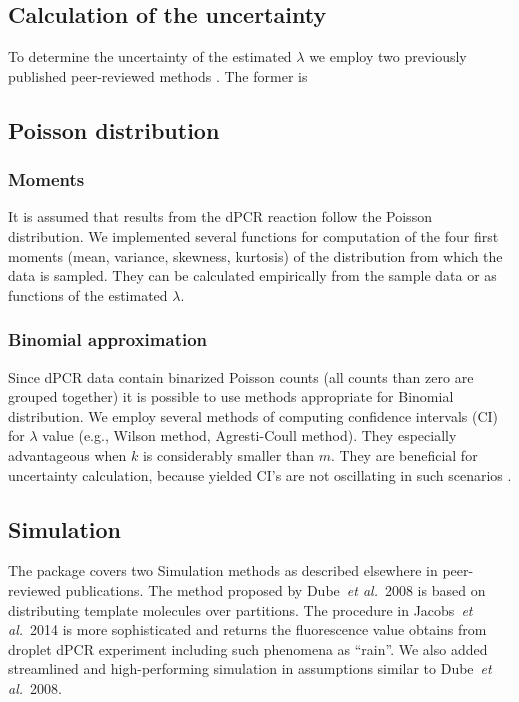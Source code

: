 \documentclass[a4,center,fleqn]{NAR}
\begin{document}
\subsection{Calculation of the uncertainty}

To determine the uncertainty of the estimated $\lambda$ we employ two 
previously 
published peer-reviewed methods \cite{dube_mathematical_2008, bhat_single_2009}.
The former is

\subsection{Poisson distribution}


\subsubsection{Moments}
It is assumed that results from the dPCR reaction follow the Poisson 
distribution. We implemented several functions for computation of the four 
first 
moments (mean, variance, skewness, kurtosis) of the distribution from which the 
data is sampled. They can be calculated empirically from the sample data or as 
functions of the estimated $\lambda$.

\subsubsection{Binomial approximation}
Since dPCR data contain binarized Poisson 
counts (all counts than zero are grouped together) it is possible to use 
methods 
appropriate for Binomial distribution. We employ several methods of computing 
confidence intervals (CI) for $\lambda$ value (e.g., Wilson method, 
Agresti-Coull method). They especially advantageous when $k$ is considerably 
smaller than $m$. They are beneficial for uncertainty calculation, because 
yielded CI's are not oscillating in such scenarios \cite{brown_2001}.

\subsection{Simulation}

The package covers two Simulation methods as described elsewhere in 
peer-reviewed publications. The method proposed by Dube~\textit{et al.}~2008 
\cite{dube_mathematical_2008} is based on distributing template molecules over 
partitions. The procedure in Jacobs~\textit{et al.}~2014 \cite{jacobs_2014} is 
more sophisticated and returns the fluorescence value obtains from droplet dPCR 
experiment including such phenomena as ``rain''. We also added streamlined and 
high-performing simulation in assumptions similar to Dube~\textit{et al.}~2008.
\end{document}
